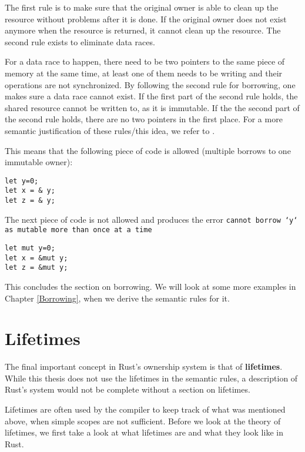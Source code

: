 The first rule is to make sure that the original owner is able to clean up the resource without problems after it is done. If the original owner does not exist anymore when the resource is returned, it cannot clean up the resource. The second rule exists to eliminate data races. 

For a data race to happen, there need to be two pointers to the same piece of memory at the same time, at least one of them needs to be writing and their operations are not synchronized. By following the second rule for borrowing, one makes sure a data race cannot exist. If the first part of the second rule holds, the shared resource cannot be written to, as it is immutable. If the the second part of the second rule holds, there are no two pointers in the first place. For a more semantic justification of these rules/this idea, we refer to \cite{boyland2003checking}.

This means that the following piece of code is allowed (multiple borrows to one immutable owner):

\begin{verbatim}
let y=0;
let x = & y; 
let z = & y;
\end{verbatim}

The next piece of code is not allowed and produces the error \texttt{cannot borrow `y` as mutable more than once at a time}

\begin{verbatim}
let mut y=0;
let x = &mut y; 
let z = &mut y;
\end{verbatim}

This concludes the section on borrowing. We will look at some more examples in Chapter \ref{Borrowing}, when we derive the semantic rules for it. 

\section{Lifetimes}
The final important concept in Rust's ownership system is that of \textbf{lifetimes}. While this thesis does not use the lifetimes in the semantic rules, a description of Rust's system would not be complete without a section on lifetimes. 

Lifetimes are often used by the compiler to keep track of what was mentioned above, when simple scopes are not sufficient. Before we look at the theory of lifetimes, we first take a look at what lifetimes are and what they look like in Rust.
 

